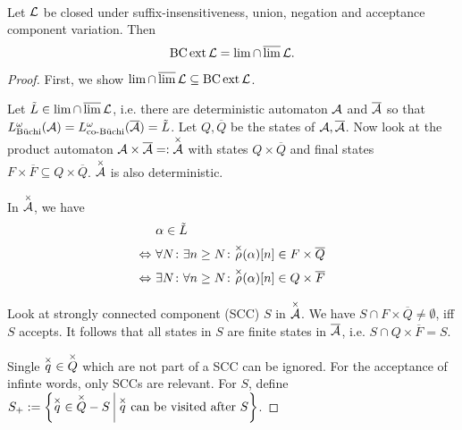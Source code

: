 \

\begin{lemma}
\label{gen:staiger-wagner}
Let $\mathcal{L}$ be closed under suffix-insensitiveness, union, negation and acceptance component variation. Then
\[ \operatorname{BC} \operatorname{ext} \mathcal{L} = \lim \cap \operatorname{\overline{lim}} \mathcal{L} . \]

\begin{proof}
First, we show $\lim \cap \operatorname{\overline{lim}} \mathcal{L} \subseteq \operatorname{BC} \operatorname{ext} \mathcal{L}$.

Let $\tilde L \in \lim \cap \operatorname{\overline{lim}} \mathcal{L}$, i.e. there are deterministic automaton $\mathcal{A}$ and $\overline {\mathcal{A}}$ so that $L^\omega_{\text{Büchi}}(\mathcal{A}) = L^\omega_{\text{co-Büchi}}(\overline {\mathcal{A}}) = \tilde L$. Let $Q,\overline Q$ be the states of $\mathcal{A},\overline {\mathcal{A}}$. Now look at the product automaton $\mathcal{A} \times \overline {\mathcal{A}} =: \overset{\times}{\mathcal{A}}$ with states $Q \times \overline Q$ and final states $F \times \overline F \subseteq Q \times \overline Q$. $\overset{\times}{\mathcal{A}}$ is also deterministic.



In $\overset{\times}{\mathcal{A}}$, we have
\begin{align*}
& \alpha \in \tilde L \\
\Leftrightarrow \ & \forall N \colon \exists n \ge N \colon \overset{\times}{\rho}(\alpha)[n] \in F \times \overline Q \\
\Leftrightarrow \ & \exists N \colon \forall n \ge N \colon \overset{\times}{\rho}(\alpha)[n] \in Q \times \overline F
\end{align*}

Look at strongly connected component (SCC) $S$ in $\overset{\times}{\mathcal{A}}$. We have $S \cap F \times \overline Q \neq \emptyset$, iff $S$ accepts. It follows that all states in $S$ are finite states in $\overline {\mathcal{A}}$, i.e. $S \cap Q \times \overline F = S$.

Single $\overset{\times}{q} \in \overset{\times}{Q}$ which are not part of a SCC can be ignored. For the acceptance of infinte words, only SCCs are relevant. For $S$, define $S_+ := \Set{\overx{q} \in \overx{Q}-S}{\overx{q} \text{ can be visited after } S}$.


\end{proof}
\end{lemma}
